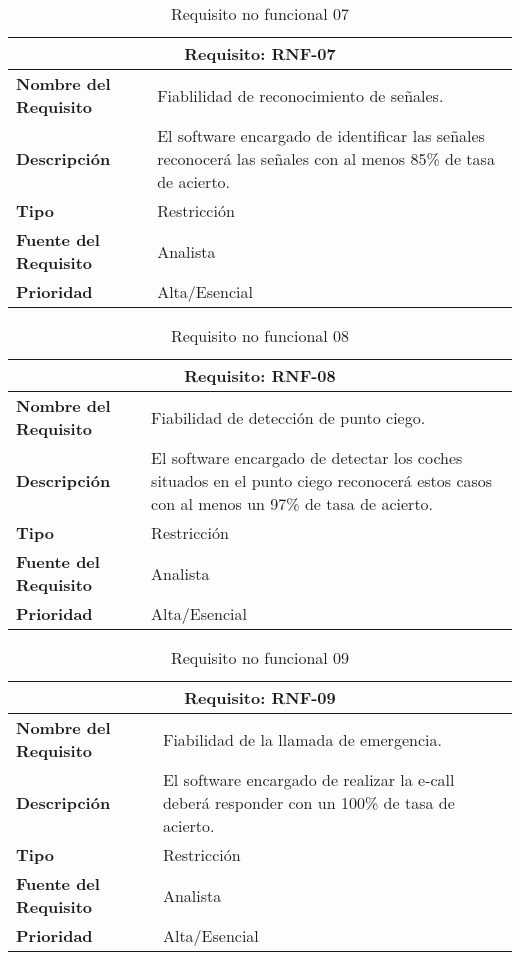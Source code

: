 \begin{table}[H]
\begin{center}
\begin{tabular}{p{} p{7cm}}
\multicolumn{2}{c}{\textbf{Requisito: RNF-07} } \\
\hline \hline
\textbf{Nombre del Requisito} & Fiablilidad de reconocimiento de señales.\\
\hline
\textbf{Descripción} &  El software encargado de identificar las señales reconocerá las señales con al menos 85\% de tasa de acierto.\\
\hline
\textbf{Tipo} & Restricción  \\
\hline
\textbf{Fuente del Requisito} & Analista  \\
\hline
\textbf{Prioridad} & Alta/Esencial \\ \hline
\end{tabular}
\caption{Requisito no funcional 07}
\label{tab:RNF-07}
\end{center}
\end{table}

\begin{table}[H]
\begin{center}
\begin{tabular}{p{} p{7cm}}
\multicolumn{2}{c}{\textbf{Requisito: RNF-08} } \\
\hline \hline
\textbf{Nombre del Requisito} & Fiabilidad de detección de punto ciego.\\
\hline
\textbf{Descripción} & El software encargado de detectar los coches situados en el punto ciego reconocerá estos casos con al menos un 97\% de tasa de acierto.\\
\hline
\textbf{Tipo} & Restricción  \\
\hline
\textbf{Fuente del Requisito} & Analista  \\
\hline
\textbf{Prioridad} & Alta/Esencial \\ \hline
\end{tabular}
\caption{Requisito no funcional 08}
\label{tab:RNF-08}
\end{center}
\end{table}

\begin{table}[H]
\begin{center}
\begin{tabular}{p{} p{7cm}}
\multicolumn{2}{c}{\textbf{Requisito: RNF-09} } \\
\hline \hline
\textbf{Nombre del Requisito} & Fiabilidad de la llamada de emergencia.\\
\hline
\textbf{Descripción} & El software encargado de realizar la e-call deberá responder con un 100\% de tasa de acierto.\\
\hline
\textbf{Tipo} & Restricción  \\
\hline
\textbf{Fuente del Requisito} & Analista  \\
\hline
\textbf{Prioridad} & Alta/Esencial \\ \hline
\end{tabular}
\caption{Requisito no funcional 09}
\label{tab:RNF-09}
\end{center}
\end{table}

